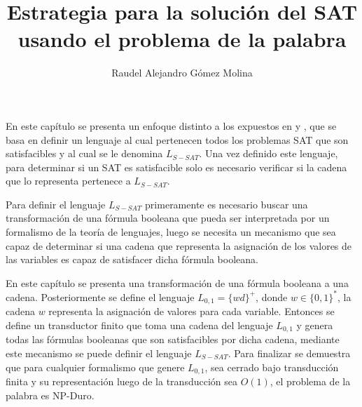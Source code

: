 \documentclass[12pt]{article}
\title{Estrategia para la solución del SAT usando el problema de la palabra}
\author{Raudel Alejandro Gómez Molina}
\begin{document}
\maketitle





En este capítulo se presenta un enfoque distinto a los expuestos en \cite{aCFSAT} y \cite{aSRCSAT}, que se basa 
en definir un lenguaje al cual pertenecen todos los problemas SAT que son satisfacibles y al cual se le 
denomina $L_{S-SAT}$. Una vez definido este lenguaje, para determinar si un SAT es satisfacible solo es 
necesario verificar si la cadena que lo representa pertenece a $L_{S-SAT}$.

Para definir el lenguaje $L_{S-SAT}$ primeramente es necesario buscar una transformación de una fórmula booleana
que pueda ser interpretada por un formalismo de la teoría de lenguajes, luego se necesita un mecanismo que sea capaz
de determinar si una cadena que representa la asignación de los valores de las variables es capaz de satisfacer dicha 
fórmula booleana.

En este capítulo se presenta una transformación de una fórmula booleana a una cadena. Posteriormente se define 
el lenguaje $L_{0,1}=\{wd\}^+$, donde $w\in\{0,1\}^*$, la cadena $w$ representa la asignación de valores para cada
variable. Entonces se define un transductor finito que toma una cadena del lenguaje $L_{0,1}$ y genera todas las 
fórmulas booleanas que son satisfacibles por dicha cadena, mediante este mecanismo se puede definir el lenguaje
$L_{S-SAT}$. Para finalizar se demuestra que para cualquier formalismo que genere $L_{0,1}$, sea cerrado bajo transducción
finita y su representación luego de la transducción sea $O(1)$, el problema de la palabra es NP-Duro.
\end{document}
